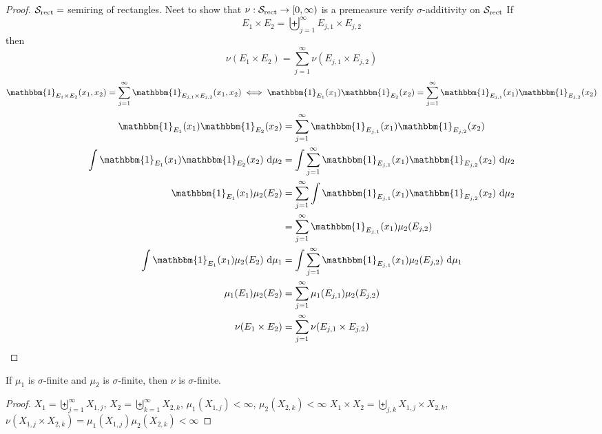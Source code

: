 \begin{proof}
  $\mathcal S_{\text{rect}} = $ semiring of rectangles.
  Neet to show that $\nu: \mathcal S_{\text{rect}} \to [0, \infty)$ is a premeasure
  verify $\sigma$-additivity on $\mathcal S_{\text{rect}}$ If 
  $$E_1 \times E_2 = \biguplus_{j=1}^\infty E_{j, 1} \times E_{j, 2}$$then
  $$\nu(E_1 \times E_2) = \sum_{j=1}^\infty \nu(E_{j, 1} \times E_{j, 2})$$
  \[\mathbbm{1}_{E_1 \times E_2}(x_1, x_2) = \sum_{j=1}^\infty \mathbbm{1}_{E_{j, 1} \times E_{j, 2}}(x_1, x_2)\iff \mathbbm{1}_{E_1}(x_1) \mathbbm{1}_{E_2}(x_2) = \sum_{j=1}^\infty \mathbbm{1}_{E_{j, 1}}(x_1) \mathbbm{1}_{E_{j, 2}}(x_2)\]
  \begin{align*}
    \mathbbm{1}_{E_1}(x_1) \mathbbm{1}_{E_2}(x_2) &= \sum_{j=1}^\infty \mathbbm{1}_{E_{j, 1}}(x_1) \mathbbm{1}_{E_{j, 2}}(x_2) \\
    \int \mathbbm{1}_{E_1}(x_1) \mathbbm{1}_{E_2}(x_2)\ \mathrm{d}\mu_2 &= \int \sum_{j=1}^\infty \mathbbm{1}_{E_{j, 1}}(x_1) \mathbbm{1}_{E_{j, 2}}(x_2) \ \mathrm{d}\mu_2\\
    \mathbbm{1}_{E_1}(x_1)\mu_2(E_2) &= \sum_{j=1}^\infty\int \mathbbm{1}_{E_{j, 1}}(x_1) \mathbbm{1}_{E_{j, 2}}(x_2) \ \mathrm{d}\mu_2\\
    &= \sum_{j=1}^\infty \mathbbm{1}_{E_{j, 1}}(x_1) \mu_2(E_{j, 2}) \\
    \int \mathbbm{1}_{E_1}(x_1)\mu_2(E_2) \ \mathrm{d}\mu_1 &= \int \sum_{j=1}^\infty \mathbbm{1}_{E_{j, 1}}(x_1) \mu_2(E_{j, 2}) \ \mathrm{d}\mu_1\\
    \mu_1(E_1)\mu_2(E_2) &= \sum_{j=1}^\infty \mu_1(E_{j, 1})\mu_2(E_{j, 2}) \\
    \nu(E_1 \times E_2) &= \sum_{j=1}^\infty \nu(E_{j, 1} \times E_{j, 2})
  \end{align*}
\end{proof}

\begin{lemma}
  If $\mu_1$ is $\sigma$-finite and $\mu_2$ is $\sigma$-finite, then $\nu$ is $\sigma$-finite.
\end{lemma}
\begin{proof}
  $X_1 = \biguplus_{j=1}^\infty X_{1, j}$, $X_2 = \biguplus_{k=1}^\infty X_{2, k}$, $\mu_1(X_{1, j}) < \infty$, $\mu_2(X_{2, k}) < \infty$
  $X_1 \times X_2 = \biguplus_{j, k} X_{1, j} \times X_{2, k}$, $\nu(X_{1, j} \times X_{2, k}) = \mu_1(X_{1, j})\mu_2(X_{2, k}) < \infty$
\end{proof}

